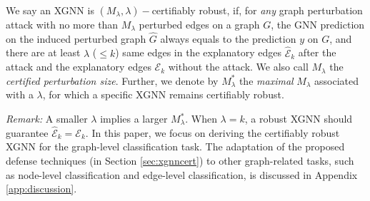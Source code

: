 \begin{definition}
\label{def:certxgnn}
We say an XGNN is $(M_{\lambda},\lambda)-$certifiably robust, 
if, for \emph{any} graph perturbation attack with no more than $M_{\lambda}$ perturbed edges on a graph $G$, the GNN prediction on the induced perturbed graph $\hat{G}$ always equals to the prediction $y$ on $G$, and there are at least $\lambda$ ($\leq k$) same edges in the explanatory edges $\hat{\mathcal{E}}_k$ after the attack and the explanatory edges $\mathcal{E}_k$ without the attack. 
We also call $M_{\lambda}$ the \emph{certified perturbation size}. 
{Further, we denote by $M_{\lambda}^*$ the \emph{maximal} $M_{\lambda}$  associated with a $\lambda$, for which a specific XGNN remains certifiably robust.} 
\vspace{-2mm}
\end{definition}

\emph{Remark:} A smaller $\lambda$ implies a larger {$M_\lambda^*$}.  
When $\lambda=k$, a robust XGNN should guarantee $\hat{\mathcal{E}}_k = \mathcal{E}_k$. 
In this paper, we focus on deriving the certifiably robust XGNN for the graph-level classification task. The adaptation of the proposed defense techniques (in Section \ref{sec:xgnncert}) to other graph-related tasks, such as node-level classification and edge-level classification, is discussed in Appendix \ref{app:discussion}.

